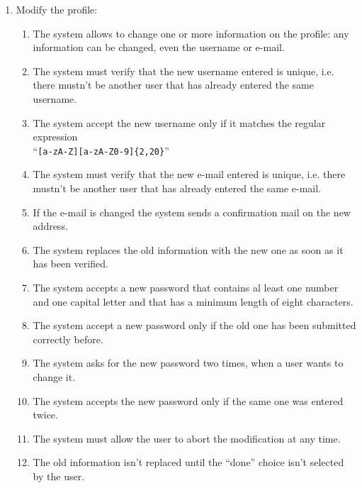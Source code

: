\begin{enumerate}
\item Modify the profile:
\begin{enumerate}
\item The system allows to change one or more information on the profile: any information can be changed, even the username or e-mail.
\item The system must verify that the new username entered is unique, i.e. there mustn't be another user that has already entered the same username. 
\item  The system accept the new username only if it matches the regular expression\\``\texttt{[a-zA-Z][a-zA-Z0-9]\{2,20\}}'' 
\item The system must verify that the new e-mail entered is unique, i.e. there mustn't be another user that has already entered the same e-mail. 
\item If the e-mail is changed the system sends a confirmation mail on the new address.
\item The system replaces the old information with the new one as soon as it has been verified.
\item The system accepts a new password that contains al least one number and one capital letter and that has a minimum length of eight characters.
\item The system accept a new password only if the old one has been submitted correctly before.
\item The system asks for the new password two times, when a user wants to change it.
\item The system accepts the new password only if the same one was entered twice.
\item The system must allow the user to abort the modification at any time.
\item The old information isn't  replaced until the ``done'' choice isn't selected by the user.
\end{enumerate}




\end{enumerate}




